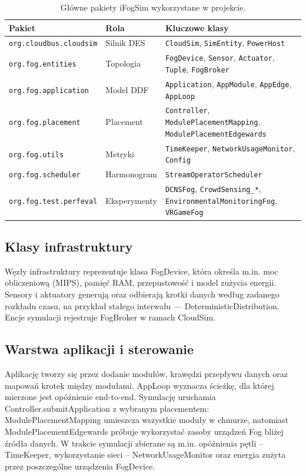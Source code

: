 \documentclass[
    oneside,            %
    left=2.5cm,         %
    right=2.5cm,        %
    top=2.5cm,          %
    bottom=3cm,         %
    bindingoffset=6mm,  %
    nohyphenation=false %
]{eiti/eiti-report}
\begin{document}
\begin{table}[htbp]
\centering
\scriptsize
\setlength{\tabcolsep}{3pt}
\renewcommand{\arraystretch}{1.1}
\begin{tabularx}{\textwidth}{|>{\raggedright\arraybackslash}p{}|>{\raggedright\arraybackslash}p{}|>{\raggedright\arraybackslash}X|}
\hline
Pakiet & Rola & Kluczowe klasy \\
\hline
\texttt{org.cloudbus.cloudsim} & Silnik DES & \texttt{CloudSim}, \texttt{SimEntity}, \texttt{PowerHost} \\
\texttt{org.fog.entities} & Topologia & \texttt{FogDevice}, \texttt{Sensor}, \texttt{Actuator}, \texttt{Tuple}, \texttt{FogBroker} \\
\texttt{org.fog.application} & Model DDF & \texttt{Application}, \texttt{AppModule}, \texttt{AppEdge}, \texttt{AppLoop} \\
\texttt{org.fog.placement} & Placement & \texttt{Controller}, \texttt{ModulePlacementMapping}, \texttt{ModulePlacementEdgewards} \\
\texttt{org.fog.utils} & Metryki & \texttt{TimeKeeper}, \texttt{NetworkUsageMonitor}, \texttt{Config} \\
\texttt{org.fog.scheduler} & Harmonogram & \texttt{StreamOperatorScheduler} \\
\texttt{org.fog.test.perfeval} & Eksperymenty & \texttt{DCNSFog}, \texttt{CrowdSensing\_*}, \texttt{EnvironmentalMonitoringFog}, \texttt{VRGameFog} \\
\hline
\end{tabularx}
\caption{Główne pakiety iFogSim wykorzystane w projekcie.}
\label{tab:packages}
\end{table}

\subsection{Klasy infrastruktury}
Węzły infrastruktury reprezentuje klasa FogDevice, która określa m.in. moc obliczeniową (MIPS), pamięć RAM, przepustowość i model zużycia energii. Sensory i aktuatory generują oraz odbierają krotki danych według zadanego rozkładu czasu, na przykład stałego interwału — DeterministicDistribution. Encje symulacji rejestruje FogBroker w ramach CloudSim.

\subsection{Warstwa aplikacji i sterowanie}
Aplikację tworzy się przez dodanie modułów, krawędzi przepływu danych oraz mapowań krotek między modułami. AppLoop wyznacza ścieżkę, dla której mierzone jest opóźnienie end-to-end. Symulację uruchamia Controller.submitApplication z wybranym placementem: ModulePlacementMapping umieszcza wszystkie moduły w chmurze, natomiast ModulePlacementEdgewards próbuje wykorzystać zasoby urządzeń Fog bliżej źródła danych.
W trakcie symulacji zbierane są m.in. opóźnienia pętli – TimeKeeper, wykorzystanie sieci – NetworkUsageMonitor oraz energia zużyta przez poszczególne urządzenia FogDevice.
\end{document}
